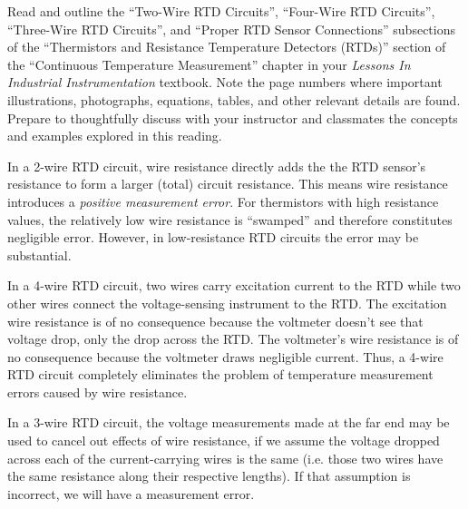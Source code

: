 

Read and outline the ``Two-Wire RTD Circuits'', ``Four-Wire RTD Circuits'', ``Three-Wire RTD Circuits'', and ``Proper RTD Sensor Connections'' subsections of the ``Thermistors and Resistance Temperature Detectors (RTDs)'' section of the ``Continuous Temperature Measurement'' chapter in your {\it Lessons In Industrial Instrumentation} textbook.  Note the page numbers where important illustrations, photographs, equations, tables, and other relevant details are found.  Prepare to thoughtfully discuss with your instructor and classmates the concepts and examples explored in this reading.














In a 2-wire RTD circuit, wire resistance directly adds the the RTD sensor's resistance to form a larger (total) circuit resistance.  This means wire resistance introduces a {\it positive measurement error}.  For thermistors with high resistance values, the relatively low wire resistance is ``swamped'' and therefore constitutes negligible error.  However, in low-resistance RTD circuits the error may be substantial.

\vskip 10pt

In a 4-wire RTD circuit, two wires carry excitation current to the RTD while two other wires connect the voltage-sensing instrument to the RTD.  The excitation wire resistance is of no consequence because the voltmeter doesn't see that voltage drop, only the drop across the RTD.  The voltmeter's wire resistance is of no consequence because the voltmeter draws negligible current.  Thus, a 4-wire RTD circuit completely eliminates the problem of temperature measurement errors caused by wire resistance.

\vskip 10pt

In a 3-wire RTD circuit, the voltage measurements made at the far end may be used to cancel out effects of wire resistance, if we assume the voltage dropped across each of the current-carrying wires is the same (i.e. those two wires have the same resistance along their respective lengths).  If that assumption is incorrect, we will have a measurement error.

